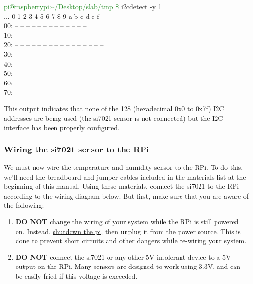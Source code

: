 \documentclass{article}
\newcommand*{\myfont}{\fontfamily{pcr}\selectfont}
\newcommand{\outputb}[2]{
  \begin{tcolorbox}[width=\textwidth,colback={light-gray},title={#1},colbacktitle=gray,coltitle=light-gray]
    \myfont
    #2
  \end{tcolorbox}
} %
\begin{document}
    \outputb{I2C interface detection output (si7021 \textbf{NOT} wired)}
    {
      \textcolor{ForestGreen}{pi@raspberrypi:\textasciitilde/Desktop/slab/tmp \$} i2cdetect -y 1 \\
    ...       0  1  2  3  4  5  6  7  8  9  a  b  c  d  e  f \\
      00:          -- -- -- -- -- -- -- -- -- -- -- -- -- \\
      10: -- -- -- -- -- -- -- -- -- -- -- -- -- -- -- -- \\
      20: -- -- -- -- -- -- -- -- -- -- -- -- -- -- -- -- \\
      30: -- -- -- -- -- -- -- -- -- -- -- -- -- -- -- -- \\
      40: -- -- -- -- -- -- -- -- -- -- -- -- -- -- -- -- \\
      50: -- -- -- -- -- -- -- -- -- -- -- -- -- -- -- -- \\
      60: -- -- -- -- -- -- -- -- -- -- -- -- -- -- -- -- \\
      70: -- -- -- -- -- -- -- --
    }

    This output indicates that none of the 128 (hexadecimal 0x0 to 0x7f) I2C addresses are being used (the si7021 sensor is not connected) but the I2C interface has been properly configured.

  \subsubsection{Wiring the si7021 sensor to the RPi}
  We must now wire the temperature and humidity sensor to the RPi. To do this, we'll need the breadboard and jumper cables included in the materials list at the beginning of this manual. Using these materials, connect the si7021 to the RPi according to the wiring diagram below. But first, make sure that you are aware of the following:
  \begin{enumerate}
    \item \textbf{DO NOT} change the wiring of your system while the RPi is still powered on. Instead, \hyperref[sec:shutting-down]{shutdown the pi}, then unplug it from the power source. This is done to prevent short circuits and other dangers while re-wiring your system.
    \item \textbf{DO NOT} connect the si7021 or any other 5V intolerant device to a 5V output on the RPi. Many sensors are designed to work using 3.3V, and can be easily fried if this voltage is exceeded.
  \end{enumerate}
\end{document}
